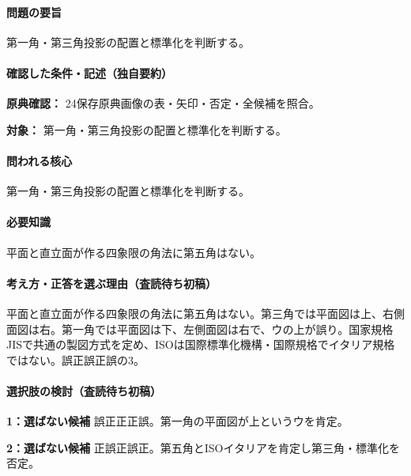 \paragraph{問題の要旨} 第一角・第三角投影の配置と標準化を判断する。

\paragraph{確認した条件・記述（独自要約）}\mbox{}\par

\noindent\textbf{原典確認：} 24保存原典画像の表・矢印・否定・全候補を照合。\par

\noindent\textbf{対象：} 第一角・第三角投影の配置と標準化を判断する。\par

\paragraph{問われる核心} 第一角・第三角投影の配置と標準化を判断する。

\paragraph{必要知識} 平面と直立面が作る四象限の角法に第五角はない。

\paragraph{考え方・正答を選ぶ理由（査読待ち初稿）} 平面と直立面が作る四象限の角法に第五角はない。第三角では平面図は上、右側面図は右。第一角では平面図は下、左側面図は右で、ウの上が誤り。国家規格JISで共通の製図方式を定め、ISOは国際標準化機構・国際規格でイタリア規格ではない。誤正誤正誤の3。

\paragraph{選択肢の検討（査読待ち初稿）}\mbox{}\par

\noindent\textbf{1：選ばない候補} 誤正正正誤。第一角の平面図が上というウを肯定。\par

\noindent\textbf{2：選ばない候補} 正誤正誤正。第五角とISOイタリアを肯定し第三角・標準化を否定。\par

